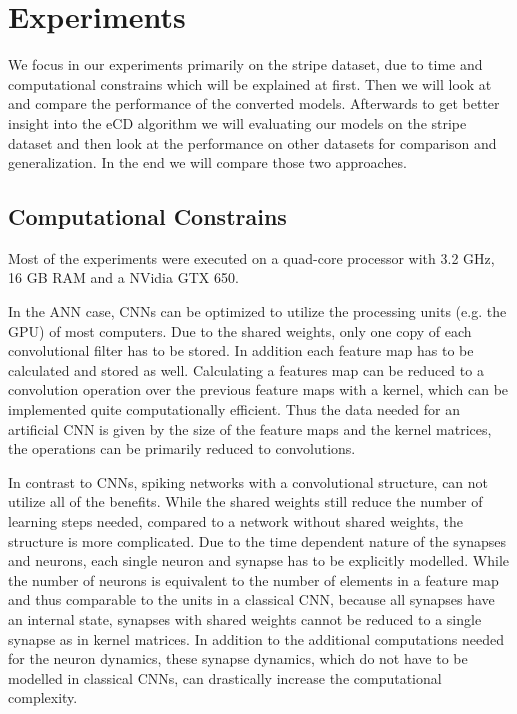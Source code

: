 \section{Experiments} \label{c:exps}

We focus in our experiments primarily on the stripe dataset, due to time and computational constrains which will be explained at first.
Then we will look at and compare the performance of the converted models.
Afterwards to get better insight into the eCD algorithm we will evaluating our models on the stripe dataset and then look at the performance on other datasets for comparison and generalization.
In the end we will compare those two approaches.

\subsection{Computational Constrains} \label{c:compconstr}

Most of the experiments were executed on a quad-core processor with 3.2 GHz, 16 GB RAM and a NVidia GTX 650.

In the ANN case, CNNs can be optimized to utilize the processing units (e.g. the GPU) of most computers. 
Due to the shared weights, only one copy of each convolutional filter has to be stored. 
In addition each feature map has to be calculated and stored as well.
Calculating a features map can be reduced to a convolution operation over the previous feature maps with a kernel, which can be implemented quite computationally efficient.
Thus the data needed for an artificial CNN is given by the size of the feature maps and the kernel matrices, the operations can be primarily reduced to convolutions.  

In contrast to CNNs, spiking networks with a convolutional structure, can not utilize all of the benefits.
While the shared weights still reduce the number of learning steps needed, compared to a network without shared weights, the structure is more complicated.
Due to the time dependent nature of the synapses and neurons, each single neuron and synapse has to be explicitly modelled.
While the number of neurons is equivalent to the number of elements in a feature map and thus comparable to the units in a classical CNN, because all synapses have an internal state, synapses with shared weights cannot be reduced to a single synapse as in kernel matrices.
In addition to the additional computations needed for the neuron dynamics, these synapse dynamics, which do not have to be modelled in classical CNNs, can drastically increase the computational complexity.   

